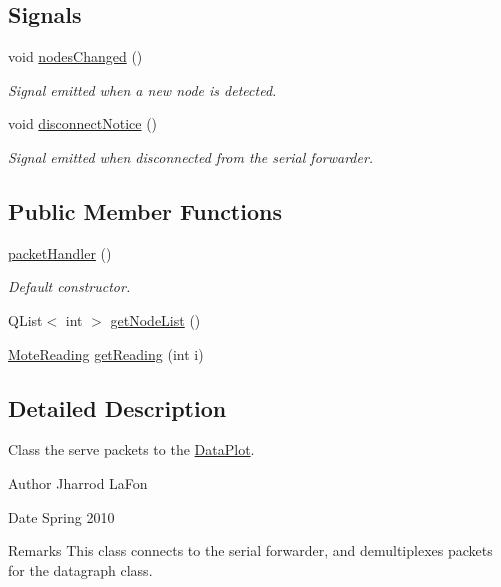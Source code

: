 \subsection*{Signals}
\begin{DoxyCompactItemize}
\item 
\hypertarget{classpacketHandler_a0e8f4d081f531b5e568c052f5b8babb9}{
void \hyperlink{classpacketHandler_a0e8f4d081f531b5e568c052f5b8babb9}{nodesChanged} ()}
\label{classpacketHandler_a0e8f4d081f531b5e568c052f5b8babb9}

\begin{DoxyCompactList}\small\item\em Signal emitted when a new node is detected. \item\end{DoxyCompactList}\item 
\hypertarget{classpacketHandler_a033895b001ec68791c5d0872df03e626}{
void \hyperlink{classpacketHandler_a033895b001ec68791c5d0872df03e626}{disconnectNotice} ()}
\label{classpacketHandler_a033895b001ec68791c5d0872df03e626}

\begin{DoxyCompactList}\small\item\em Signal emitted when disconnected from the serial forwarder. \item\end{DoxyCompactList}\end{DoxyCompactItemize}
\subsection*{Public Member Functions}
\begin{DoxyCompactItemize}
\item 
\hyperlink{classpacketHandler_a02936b9105618ed38701274efcfa0dfb}{packetHandler} ()
\begin{DoxyCompactList}\small\item\em Default constructor. \item\end{DoxyCompactList}\item 
QList$<$ int $>$ \hyperlink{classpacketHandler_a7d07166d577b014234ad311599ac3291}{getNodeList} ()
\item 
\hyperlink{classMoteReading}{MoteReading} \hyperlink{classpacketHandler_aec6fa94602daa18227491b76001152cb}{getReading} (int i)
\end{DoxyCompactItemize}


\subsection{Detailed Description}
Class the serve packets to the \hyperlink{classDataPlot}{DataPlot}. \begin{DoxyAuthor}{Author}
Jharrod LaFon 
\end{DoxyAuthor}
\begin{DoxyDate}{Date}
Spring 2010 
\end{DoxyDate}
\begin{DoxyRemark}{Remarks}
This class connects to the serial forwarder, and demultiplexes packets for the datagraph class. 
\end{DoxyRemark}


